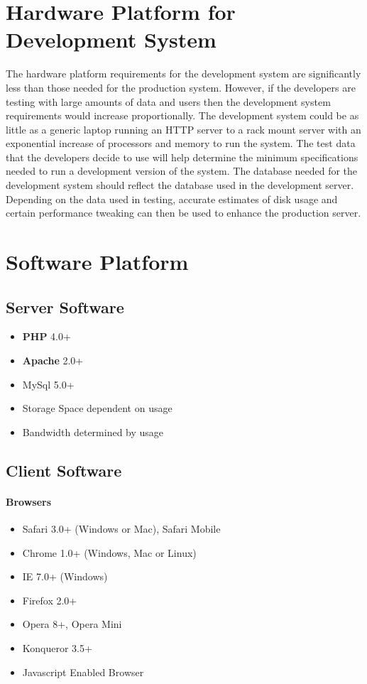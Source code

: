\documentclass[letterpaper,12pt]{report}
\begin{document}
\section{Hardware Platform for Development System}
The hardware platform requirements for the development system are significantly less than those needed for the production system. However, if the developers are testing with large amounts of data and users then the development system requirements would increase proportionally. The development system could be as little as a generic laptop running an HTTP server to a rack mount server with an exponential increase of processors and memory to run the system. The test data that the developers decide to use will help determine the minimum specifications needed to run a development version of the system.
The database needed for the development system should reflect the database used in the development server. Depending on the data used in testing, accurate estimates of disk usage and certain performance tweaking can then be used to enhance the production server.

\pagebreak
\section{Software Platform}
\subsection{Server Software}
\begin{itemize}
 \item \textbf{PHP} 4.0+ 
 \item \textbf{Apache} 2.0+
 \item MySql 5.0+ 
 \item Storage Space dependent on usage
 \item Bandwidth determined by usage
\end{itemize}

\subsection{Client Software}
\paragraph{Browsers}
\begin{itemize}
 \item Safari 3.0+ (Windows or Mac), Safari Mobile
 \item Chrome 1.0+ (Windows, Mac or Linux)
 \item IE 7.0+ (Windows)
 \item Firefox 2.0+
 \item Opera 8+, Opera Mini
 \item Konqueror 3.5+
 \item Javascript Enabled Browser
\end{itemize}
\end{document}
